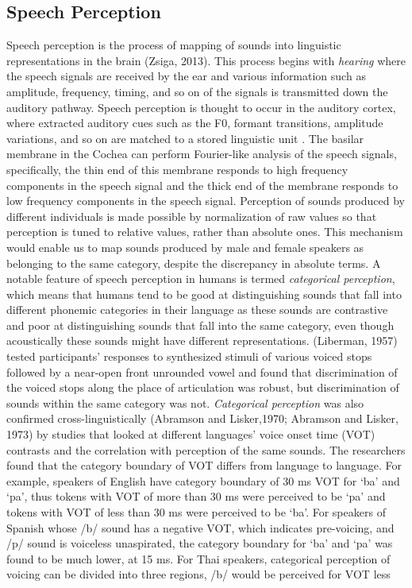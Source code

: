 \documentclass[a4paper]{article}
\begin{document}
\subsection{Speech Perception}

Speech perception is the process of mapping of sounds into linguistic representations in the brain (Zsiga, 2013). This process begins with \textit{hearing} where the speech signals are received by the ear and various information such as amplitude, frequency, timing, and so on of the signals is transmitted down the auditory pathway. Speech perception is thought to occur in the auditory cortex, where extracted auditory cues such as the F0, formant transitions, amplitude variations, and so on are matched to a stored linguistic unit \cite{Zsiga:2013aa}. The basilar membrane in the Cochea can perform Fourier-like analysis of the speech signals, specifically, the thin end of this membrane responds to high frequency components in the speech signal and the thick end of the membrane responds to low frequency components in the speech signal. Perception of sounds produced by different individuals is made possible by normalization of raw values so that perception is tuned to relative values, rather than absolute ones. This mechanism would enable us to map sounds produced by male and female speakers as belonging to the same category, despite the discrepancy in absolute terms. A notable feature of speech perception in humans is termed \textit{categorical perception}, which means that humans tend to be good at distinguishing sounds that fall into different phonemic categories in their language as these sounds are contrastive and poor at distinguishing sounds that fall into the same category, even though acoustically these sounds might have different representations. (Liberman, 1957) tested participants' responses to synthesized stimuli of various voiced stops followed by a near-open front unrounded vowel and found that discrimination of the voiced stops along the place of articulation was robust, but discrimination of sounds within the same category was not.  \textit{Categorical perception} was also confirmed cross-linguistically (Abramson and Lisker,1970; Abramson and Lisker, 1973) by studies that looked at different languages' voice onset time (VOT) contrasts and the correlation with perception of the same sounds. The researchers found that the category boundary of VOT differs from language to language. For example, speakers of English have category boundary of 30 ms VOT for `ba' and `pa', thus tokens with VOT of more than 30 ms were perceived to be `pa' and tokens with VOT of less than 30 ms were perceived to be `ba'. For speakers of Spanish whose /b/ sound has a negative VOT, which indicates pre-voicing, and /p/ sound is voiceless unaspirated, the category boundary for `ba' and `pa' was found to be much lower, at 15 ms. For Thai speakers, categorical perception of voicing can be divided into three regions, /b/ would be perceived for VOT less 
\end{document}
